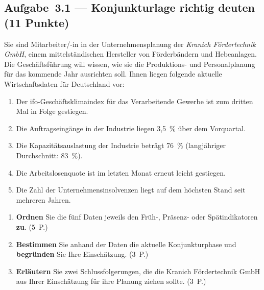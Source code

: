 
\subsection*{Aufgabe~3.1 --- Konjunkturlage richtig deuten (11 Punkte)}

Sie sind Mitarbeiter/-in in der Unternehmensplanung der \emph{Kranich Fördertechnik GmbH},
einem mittelständischen Hersteller von Förderbändern und Hebeanlagen. Die Geschäftsführung
will wissen, wie sie die Produktions- und Personalplanung für das kommende Jahr ausrichten
soll. Ihnen liegen folgende aktuelle Wirtschaftsdaten für Deutschland vor:

\begin{enumerate}[label=(\arabic*)]
  \item Der ifo-Geschäftsklimaindex für das Verarbeitende Gewerbe ist zum dritten Mal in
    Folge gestiegen.
  \item Die Auftragseingänge in der Industrie liegen 3,5~\% über dem Vorquartal.
  \item Die Kapazitätsauslastung der Industrie beträgt 76~\% (langjähriger Durchschnitt:
    83~\%).
  \item Die Arbeitslosenquote ist im letzten Monat erneut leicht gestiegen.
  \item Die Zahl der Unternehmensinsolvenzen liegt auf dem höchsten Stand seit mehreren
    Jahren.
\end{enumerate}

\begin{enumerate}[label=\alph*)]
  \item \textbf{Ordnen} Sie die fünf Daten jeweils den Früh-, Präsenz- oder
    Spätindikatoren \textbf{zu}. \hfill (5~P.)
  \item \textbf{Bestimmen} Sie anhand der Daten die aktuelle Konjunkturphase und
    \textbf{begründen} Sie Ihre Einschätzung. \hfill (3~P.)
  \item \textbf{Erläutern} Sie zwei Schlussfolgerungen, die die Kranich Fördertechnik GmbH
    aus Ihrer Einschätzung für ihre Planung ziehen sollte. \hfill (3~P.)
\end{enumerate}

